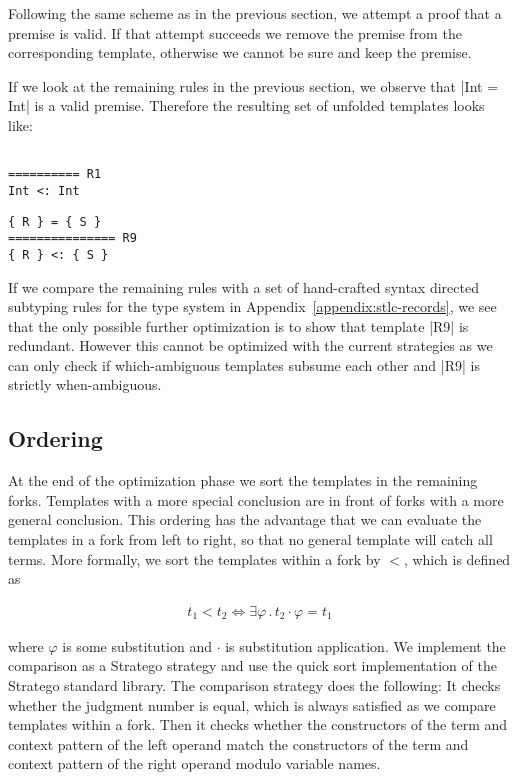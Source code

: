 Following the same scheme as in the previous section, we attempt a
proof that a premise is valid. If that attempt succeeds we remove the
premise from the corresponding template, otherwise we cannot be sure
and keep the premise.

If we look at the remaining rules in the previous section, we observe
that \code|Int = Int| is a valid premise. Therefore the resulting set
of unfolded templates looks like:
\begin{multicols}{2}
\begin{lstlisting}[language=sltc]

========== R1
Int <: Int
\end{lstlisting}
\begin{lstlisting}[language=sltc]
{ R } = { S }
=============== R9
{ R } <: { S }
\end{lstlisting}
\end{multicols}
If we compare the remaining rules with a set of hand-crafted syntax
directed subtyping rules for the type system in
Appendix~\ref{appendix:stlc-records}, we see that the only possible
further optimization is to show that template \code|R9| is
redundant. However this cannot be optimized with the current
strategies as we can only check if which-ambiguous templates subsume
each other and \code|R9| is strictly when-ambiguous.

\subsection{Ordering}
At the end of the optimization phase we sort the templates in the
remaining forks. Templates with a more special conclusion are in front
of forks with a more general conclusion. This ordering has the
advantage that we can evaluate the templates in a fork from left to
right, so that no general template will catch all terms. More
formally, we sort the templates within a fork by $<$, which is defined
as

\begin{align}
  t_1 < t_2 \iff \exists \varphi \,.\, t_2\cdot\varphi = t_1
\end{align}

where $\varphi$ is some substitution and $\cdot$ is substitution
application. We implement the comparison as a Stratego strategy and
use the quick sort implementation of the Stratego standard
library. The comparison strategy does the following: It checks whether
the judgment number is equal, which is always satisfied as we compare
templates within a fork. Then it checks whether the constructors of
the term and context pattern of the left operand match the
constructors of the term and context pattern of the right operand
modulo variable names.

